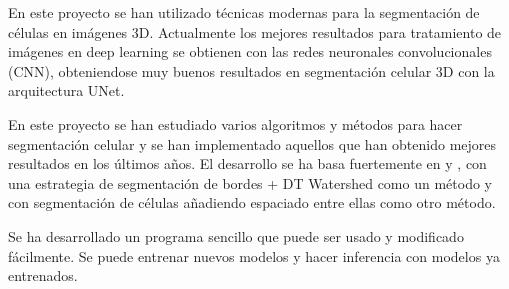 
En este proyecto se han utilizado técnicas modernas para la segmentación de células en imágenes 3D. Actualmente los mejores resultados para tratamiento de imágenes en deep learning se obtienen con las redes neuronales convolucionales (CNN), obteniendose muy buenos resultados en segmentación celular 3D con la arquitectura UNet.

En este proyecto se han estudiado varios algoritmos y métodos para hacer segmentación celular y se han implementado aquellos que han obtenido mejores resultados en los últimos años. El desarrollo se ha basa fuertemente en \cite{Wolny2020} y \cite{Falk2019}, con una estrategia de segmentación de bordes + DT Watershed como un método y con segmentación de células añadiendo espaciado entre ellas como otro método.

Se ha desarrollado un programa sencillo que puede ser usado y modificado fácilmente. Se puede entrenar nuevos modelos y hacer inferencia con modelos ya entrenados.
